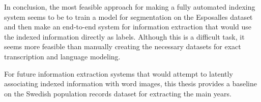 In conclusion, the most feasible approach for making a fully automated indexing system seems to be to train a model for segmentation on the Esposalles dataset \cite{esposalles} and then make an end-to-end system for information extraction that would use the indexed information directly as labels. Although this is a difficult task, it seems more feasible than manually creating the necessary datasets for exact transcription and language modeling.

For future information extraction systems that would attempt to latently associating indexed information with word images, this thesis provides a baseline on the Swedish population records dataset for extracting the main years.






